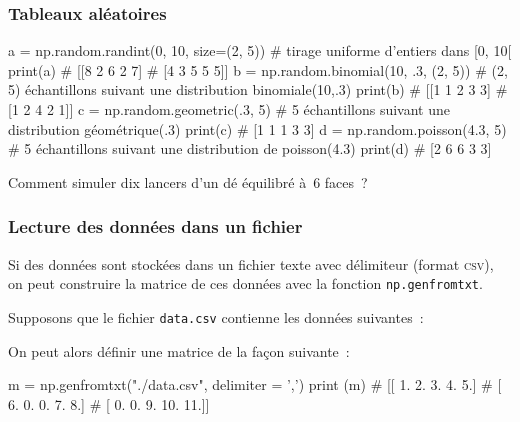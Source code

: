 \documentclass[10pt,fleqn]{article} %
\begin{document}
\subsubsection{Tableaux aléatoires}

\begin{python}
a = np.random.randint(0, 10, size=(2, 5)) # tirage uniforme d'entiers dans [0, 10[
print(a)
# [[8 2 6 2 7]
#  [4 3 5 5 5]]
b = np.random.binomial(10, .3, (2, 5)) #  (2, 5) échantillons suivant une distribution binomiale(10,.3)
print(b)
# [[1 1 2 3 3]
#  [1 2 4 2 1]]
c = np.random.geometric(.3, 5) # 5 échantillons suivant une distribution géométrique(.3)
print(c)
# [1 1 1 3 3]
d = np.random.poisson(4.3, 5) # 5 échantillons suivant une distribution de poisson(4.3)
print(d)
# [2 6 6 3 3]
\end{python}



  Comment simuler dix lancers d'un dé équilibré à~$6$ faces~?%

\subsubsection{Lecture des données dans un fichier}

Si des données sont stockées dans un fichier texte avec délimiteur (format
\textsc{csv}), on peut construire la matrice de ces données avec la
fonction \texttt{np.genfromtxt}. 

\begin{multicols}{2}
Supposons que le fichier \texttt{data.csv} contienne les données suivantes~:
\begin{center}
\begin{minipage}[t]{.3\textwidth}

\end{minipage}
\end{center}
On peut alors définir une matrice de la façon suivante~: 
\begin{python}
m = np.genfromtxt("./data.csv", delimiter = ',')
print (m)
# [[  1.   2.   3.   4.   5.]
#  [  6.   0.   0.   7.   8.]
#  [  0.   0.   9.  10.  11.]]  
\end{python}

\end{multicols}
\end{document}
